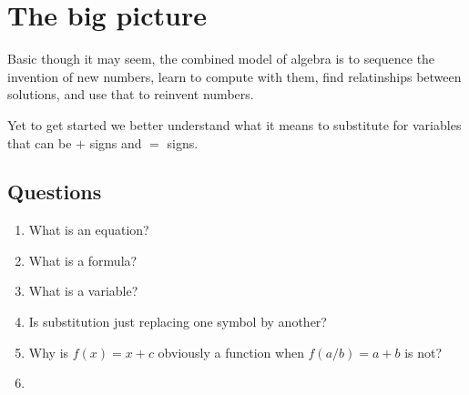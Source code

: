
\section{The big picture}
Basic though it may seem, the combined model of algebra is to sequence the 
invention of new numbers, learn to compute with them, find relatinships 
between solutions, and use that to reinvent numbers.
\begin{center}
\end{center}


Yet to get started we better understand what it means to substitute 
for variables that can be $+$ signs and $=$ signs.

\subsection{Questions}
\begin{enumerate}
    \item What is an equation?
    \item What is a formula?
    \item What is a variable?
    \item Is substitution just replacing one symbol by another?
    \item Why is $f(x)=x+c$ obviously a function when $f(a/b)=a+b$ is not?
    \item 
\end{enumerate}
